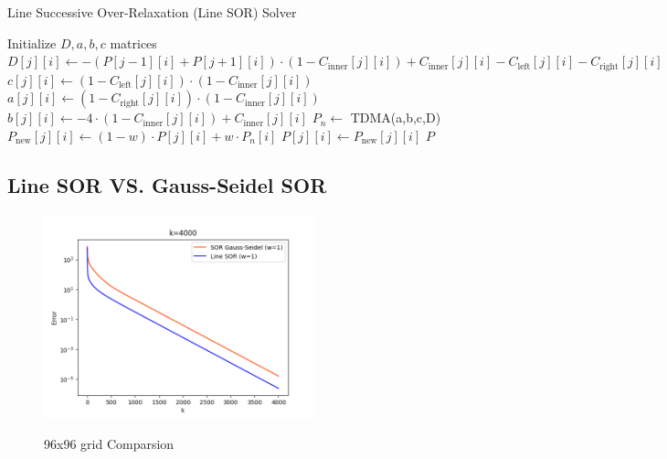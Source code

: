 \documentclass[12pt]{article}
\begin{document}
\begin{algorithm}
\caption{Line Successive Over-Relaxation (Line SOR) Solver}
\begin{algorithmic}[1]
    \State Initialize $D, a, b, c$ matrices
            \State $D[j][i] \gets -(P[j-1][i] + P[j+1][i]) \cdot (1 - C_{\text{inner}}[j][i]) + C_{\text{inner}}[j][i] - C_{\text{left}}[j][i] - C_{\text{right}}[j][i]$
            \State $c[j][i] \gets (1 - C_{\text{left}}[j][i]) \cdot (1 - C_{\text{inner}}[j][i])$
            \State $a[j][i] \gets (1 - C_{\text{right}}[j][i]) \cdot (1 - C_{\text{inner}}[j][i])$
            \State $b[j][i] \gets -4 \cdot (1 - C_{\text{inner}}[j][i]) + C_{\text{inner}}[j][i]$
        \EndFor
    \EndFor
        \State $P_n \gets$ TDMA(a,b,c,D)
            \State $P_{\text{new}}[j][i] \gets (1 - w) \cdot P[j][i] + w \cdot P_n[i]$
            \State $P[j][i] \gets P_{\text{new}}[j][i]$
        \EndFor
    \EndFor
    \State \Return $P$
\EndFunction
\end{algorithmic}
\end{algorithm}




\subsection{Line SOR VS. Gauss-Seidel SOR}





\begin{figure}[H]
    \centering
    \includegraphics[width=0.7\textwidth]{LineVSpoint96gridpng.png}
    \label{LineVSpoint96gridpng.png}
    \caption{96x96 grid Comparsion}
\end{figure}
\end{document}
